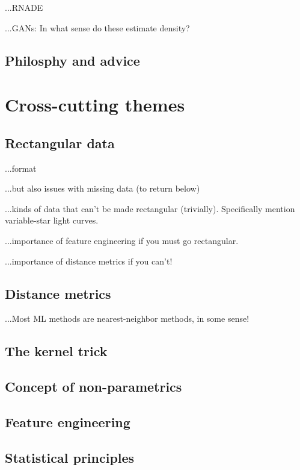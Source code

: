 \documentclass[12pt, twoside, letterpaper]{article}
\begin{document}
...RNADE

...GANs: In what sense do these estimate density?

\subsection{Philosphy and advice}

\section{Cross-cutting themes}

\subsection{Rectangular data}

...format

...but also issues with missing data (to return below)

...kinds of data that can't be made rectangular (trivially). Specifically mention variable-star light curves.

...importance of feature engineering if you must go rectangular.

...importance of distance metrics if you can't!

\subsection{Distance metrics}

...Most ML methods are nearest-neighbor methods, in some sense!

\subsection{The kernel trick}

\subsection{Concept of non-parametrics}

\subsection{Feature engineering}

\subsection{Statistical principles}
\end{document}
